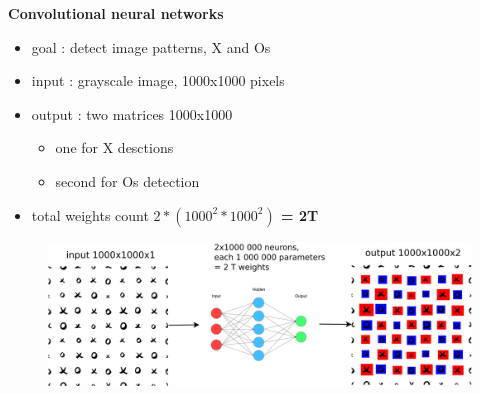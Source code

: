 \documentclass[xcolor=dvipsnames]{beamer}
\begin{document}
\begin{frame}{\bf Convolutional neural networks}

\begin{itemize}
    \item goal : detect image patterns, X and Os
    \item input   : grayscale image, 1000x1000 pixels
    \item output  : two matrices 1000x1000
                    \begin{itemize}
                        \item one for X desctions
                        \item second for Os detection
                    \end{itemize}
    \item total weights count {\bf \color{red} $2*(1000^2*1000^2)$ = 2T}
\end{itemize}

\begin{figure}
  \includegraphics[scale=0.25]{../../diagrams/nn/cnn_problem_2.png}
\end{figure}

\end{frame}
\end{document}
